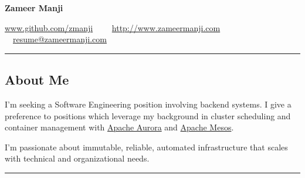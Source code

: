 \documentclass[10pt,letterpaper]{article}
\begin{document}
\begin{center}
{\huge \textbf{Zameer Manji}}


\href{http://www.github.com/zmanji/}{www.github.com/zmanji}\ \ \textbullet
\ \ \href{http://www.zameermanji.com}{http://www.zameermanji.com}\ \ \textbullet
\ \ \href{malto:resume@zameermanji.com}{resume@zameermanji.com}

\end{center}

\hrule
\vspace{-1.0em}
\subsection*{About Me}
\indent I'm seeking a Software Engineering position involving backend systems. I give a
preference to positions which leverage my background in cluster
scheduling and container management with \href{aurora.apache.org}{Apache Aurora}
and \href{mesos.apache.org}{Apache Mesos}.

I'm passionate about immutable, reliable, automated infrastructure that scales
with technical and organizational needs.
\\

\hrule
\vspace{-1.0em}
\end{document}

